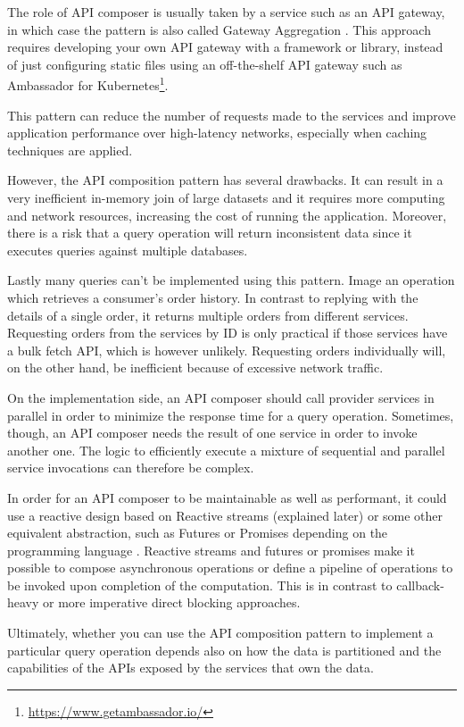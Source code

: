 \documentclass[conference]{IEEEtran}
\begin{document}
The role of API composer is usually taken by a service such as an API gateway, in which case the pattern is also called Gateway Aggregation \cite{gateway-aggregation}. This approach requires developing your own API gateway with a framework or library, instead of just configuring static files using an off-the-shelf API gateway such as Ambassador for Kubernetes\footnote{\url{https://www.getambassador.io/}}. 

This pattern can reduce the number of requests made to the services and improve application performance over high-latency networks, especially when caching techniques are applied.

However, the API composition pattern has several drawbacks. It can result in a very inefficient in-memory join of large datasets and it requires more computing and network resources, increasing the cost of running the application. Moreover, there is a risk that a query operation will return inconsistent data since it executes queries against multiple databases.

Lastly many queries can't be implemented using this pattern. Image an operation which retrieves a consumer’s order history. In contrast to replying with the details of a single order, it returns multiple orders from different services. Requesting orders from the services by ID is only practical if those services have a bulk fetch API, which is however unlikely. Requesting orders individually will, on the other hand, be inefficient because of excessive network traffic.

On the implementation side, an API composer should call provider services in parallel in order to minimize the response time for a query operation. Sometimes, though, an API composer needs the result of one service in order to invoke another one. The logic to efficiently execute a mixture of sequential and parallel service invocations can therefore be complex.

In order for an API composer to be maintainable as well as performant, it could use a reactive design based on Reactive streams (explained later) or some other equivalent abstraction, such as Futures or Promises depending on the programming language \cite{futures-and-promises}. Reactive streams and futures or promises make it possible to compose asynchronous operations or define a pipeline of operations to be invoked upon completion of the computation. This is in contrast to callback-heavy or more imperative direct blocking approaches.

Ultimately, whether you can use the API composition pattern to implement a particular query operation depends also on how the data is partitioned and the capabilities of the APIs exposed by the services that own the data. 
\end{document}
